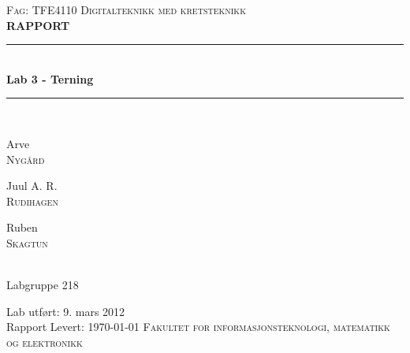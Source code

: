 \documentclass[12pt,norsk,a4paper]{article}
\newcommand{\HRule}{\rule{\linewidth}{0.5mm}}
\begin{document}
\begin{titlepage}

\begin{center}
\textsc{Fag: TFE4110 Digitalteknikk med kretsteknikk}\\[2.5cm]
\textbf{\Large RAPPORT}\\[0.5cm]


\HRule \\[0.4cm]
{ \huge \bfseries Lab 3 - Terning}\\[0.4cm]
\HRule \\[1.5cm]


\begin{minipage}{0.32\textwidth}
	\begin{center} \large
		Arve \\ 
		\textsc{Nygård}
	\end{center}
\end{minipage}
\begin{minipage}{0.32\textwidth}
	\begin{center} \large
	Juul A. R. \\
	\textsc{Rudihagen}
	\end{center}
\end{minipage}
	\begin{minipage}{0.32\textwidth}
	\begin{center} \large
	Ruben\\
	\textsc{Skagtun}
	\end{center}
\end{minipage}\\[1cm]
\large Labgruppe 218

\vfill

Lab utført: 9. mars 2012\\
Rapport Levert: \today
\vfill
\textsc{Fakultet for informasjonsteknologi, matematikk og elektronikk}
\end{center}
\end{titlepage}
\end{document}
